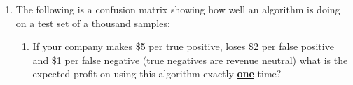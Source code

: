 \documentclass[12pt]{article}
\begin{document}
\begin{enumerate}
\begin{enumerate}
  \end{enumerate}
\newpage

\item The following is a confusion matrix showing how well an algorithm is doing on a test set of a thousand samples:
  \begin{enumerate}
  \item If your company makes \$5 per true positive, loses \$2 per false positive and \$1 per false negative (true negatives are revenue neutral) what is the expected profit on using this algorithm exactly \underline{\textbf{one}} time?
  \end{enumerate}
\newpage

\end{enumerate}
\end{document}
